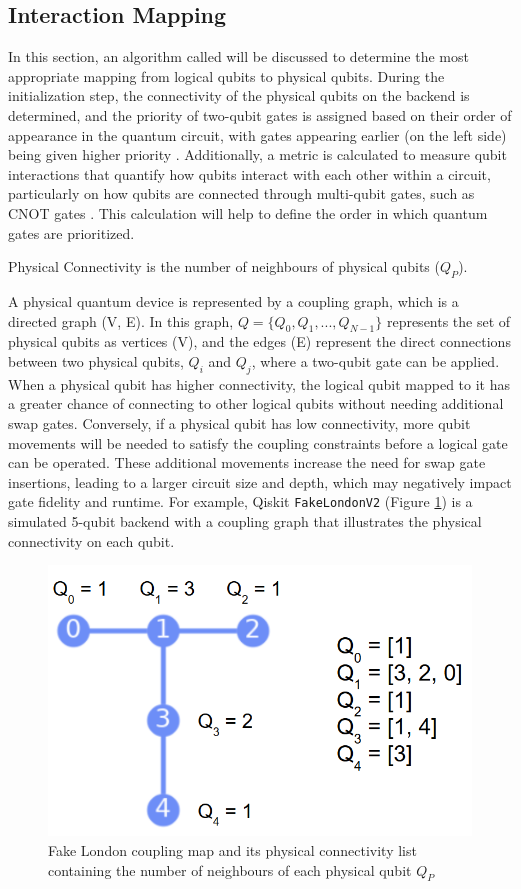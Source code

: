 \subsection{Interaction Mapping} %
In this section, an algorithm called  will be discussed to determine the most appropriate mapping from logical qubits to physical qubits. During the initialization step, the connectivity of the physical qubits on the backend is determined, and the priority of two-qubit gates is assigned based on their order of appearance in the quantum circuit, with gates appearing earlier (on the left side) being given higher priority \cite{liu_qm-dla_2024}. Additionally, a metric is calculated to measure qubit interactions that quantify how qubits interact with each other within a circuit, particularly on how qubits are connected through multi-qubit gates, such as CNOT gates \cite{bandic_interaction_2023}. This calculation will help to define the order in which quantum gates are prioritized. \\

\begin{definition} %
    Physical Connectivity is the number of neighbours of physical qubits ($Q_P$).
\end{definition}
A physical quantum device is represented by a coupling graph, which is a directed graph (V, E). In this graph, $Q = \{Q_0, Q_1, ..., Q_{N-1}\}$ represents the set of physical qubits as vertices (V), and the edges (E) represent the direct connections between two physical qubits, $Q_i$ and $Q_j$, where a two-qubit gate can be applied. When a physical qubit has higher connectivity, the logical qubit mapped to it has a greater chance of connecting to other logical qubits without needing additional swap gates. Conversely, if a physical qubit has low connectivity, more qubit movements will be needed to satisfy the coupling constraints before a logical gate can be operated. These additional movements increase the need for swap gate insertions, leading to a larger circuit size and depth, which may negatively impact gate fidelity and runtime. For example, Qiskit \lstinline{FakeLondonV2} \cite{ibmquantum_fakelondonv2} (Figure \ref{fig:fake-london})  is a simulated 5-qubit backend with a coupling graph that illustrates the physical connectivity on each qubit.
\begin{figure}[h]
    \centering
    \includegraphics[width=0.5\linewidth]{image/fake_london.png}
    \caption{Fake London coupling map and its physical connectivity list containing the number of neighbours of each physical qubit $Q_P$}
    \label{fig:fake-london}
\end{figure}

